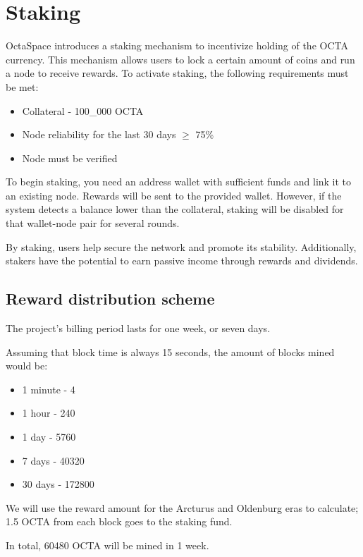 \section{Staking}
\label{sec:staking}

OctaSpace introduces a staking mechanism to incentivize holding of the OCTA currency. This mechanism allows users to lock a certain amount of coins and run a node to receive rewards. To activate staking, the following requirements must be met:

\begin{itemize}
    \item Collateral - 100\_000 OCTA
    \item Node reliability for the last 30 days $\ge$ 75\%
    \item Node must be verified
\end{itemize}

To begin staking, you need an address wallet with sufficient funds and link it to an existing node. Rewards will be sent to the provided wallet.
However, if the system detects a balance lower than the collateral, staking will be disabled for that wallet-node pair for several rounds.

By staking, users help secure the network and promote its stability. Additionally, stakers have the potential to earn passive income through rewards and dividends.

\subsection{Reward distribution scheme}

The project's billing period lasts for one week, or seven days.

Assuming that block time is always 15 seconds, the amount of blocks mined would be:

\begin{itemize}
    \item 1 minute - 4
    \item 1 hour - 240
    \item 1 day - 5760
    \item 7 days - 40320
    \item 30 days - 172800
\end{itemize}

We will use the reward amount for the Arcturus and Oldenburg eras to calculate; 1.5 OCTA from each block goes to the staking fund.

In total, 60480 OCTA will be mined in 1 week.

